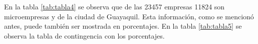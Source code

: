 \documentclass[letterpaper,]{book}
\newenvironment{Shaded}{\begin{snugshade}}{\end{snugshade}}
\newcommand{\DataTypeTok}[1]{\textcolor[rgb]{0.13,0.29,0.53}{#1}}
\newcommand{\DecValTok}[1]{\textcolor[rgb]{0.00,0.00,0.81}{#1}}
\newcommand{\KeywordTok}[1]{\textcolor[rgb]{0.13,0.29,0.53}{\textbf{#1}}}
\newcommand{\NormalTok}[1]{#1}
\newcommand{\OperatorTok}[1]{\textcolor[rgb]{0.81,0.36,0.00}{\textbf{#1}}}
\newcommand{\StringTok}[1]{\textcolor[rgb]{0.31,0.60,0.02}{#1}}
\begin{document}
En la tabla \ref{tab:tabla4} se observa que de las 23457 empresas 11824 son microempresas y de la ciudad de Guayaquil. Esta información, como se mencionó antes, puede también ser mostrada en porcentajes. En la tabla \ref{tab:tabla5} se observa la tabla de contingencia con los porcentajes.

\begin{Shaded}
\end{Shaded}

\newpage
\end{document}
